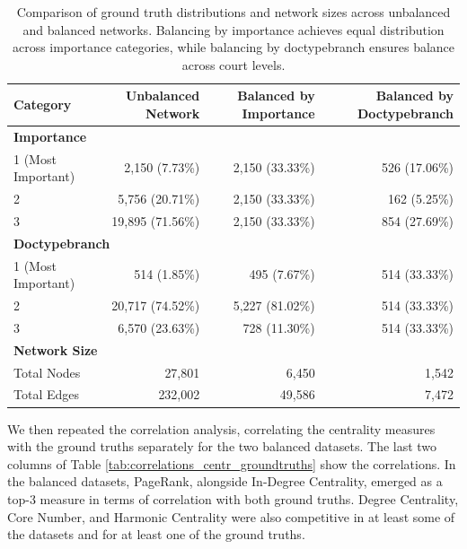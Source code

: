 \documentclass[sigconf,authordraft]{acmart}
\begin{document}
\begin{table}[t] %
\centering
\small %
\renewcommand{\arraystretch}{1.2} %
\begin{tabular}{@{}p{4cm} r r r@{}} %
\toprule
\textbf{Category} & \textbf{Unbalanced Network} & \textbf{Balanced by Importance} & \textbf{Balanced by Doctypebranch} \\ \midrule
\multicolumn{4}{l}{\textbf{Importance}} \\ \midrule
1 (Most Important) & 2,150  (7.73\%)  & 2,150  (33.33\%) &   526  (17.06\%) \\
2                  & 5,756  (20.71\%) & 2,150  (33.33\%) &   162  (5.25\%)  \\
3                  & 19,895 (71.56\%) & 2,150  (33.33\%) &   854  (27.69\%) \\ \midrule
\multicolumn{4}{l}{\textbf{Doctypebranch}} \\ \midrule
1 (Most Important) &   514  (1.85\%)  &   495  (7.67\%)  &   514  (33.33\%) \\
2                  & 20,717 (74.52\%) & 5,227  (81.02\%) &   514  (33.33\%) \\
3                  &  6,570 (23.63\%) &   728  (11.30\%) &   514  (33.33\%) \\ \midrule
\multicolumn{4}{l}{\textbf{Network Size}} \\ \midrule
Total Nodes        & 27,801           & 6,450            & 1,542 \\
Total Edges        & 232,002          & 49,586           & 7,472 \\ \bottomrule
\end{tabular}
\caption{Comparison of ground truth distributions and network sizes across unbalanced and balanced networks. Balancing by importance achieves equal distribution across importance categories, while balancing by doctypebranch ensures balance across court levels.}
\label{tab:network_balancing}
\end{table}


We then repeated the correlation analysis, correlating the centrality measures with the ground truths separately for the two balanced datasets. The last two columns of Table \ref{tab:correlations_centr_groundtruths} show the correlations.
In the balanced datasets, PageRank, alongside In-Degree Centrality, emerged as a top-3 measure in terms of correlation with both ground truths. Degree Centrality, Core Number, and Harmonic Centrality were also competitive in at least some of the datasets and for at least one of the ground truths.
\end{document}
